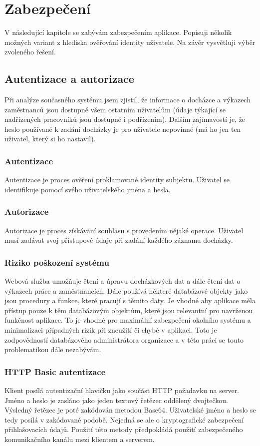 \documentclass{diplomka}
\begin{document}
\chapter{Zabezpečení}
V následující kapitole se zabývám zabezpečením aplikace. Popisuji několik možných variant z hlediska ověřování identity uživatele. Na závěr vysvětluji výběr zvoleného řešení.
\section{Autentizace a autorizace}
Při analýze současného systému jsem zjistil, že informace o docházce a výkazech zaměstnanců jsou dostupné všem ostatním uživatelům (údaje týkající se nadřízených pracovníků jsou dostupné i podřízením). Dalším zajímavostí je, že heslo používané k zadání docházky je pro uživatele nepovinné (má ho jen ten uživatel, který si ho nastavil). 

\subsection*{Autentizace}
Autentizace je proces ověření proklamované identity subjektu. Uživatel se identifikuje pomocí svého uživatelského jména a hesla.

\subsection*{Autorizace}
Autorizace je proces získávání souhlasu s provedením nějaké operace. Uživatel musí zadávat svoj přístupové údaje při zadání každého záznamu docházky. 

\subsection*{Riziko poškození systému}
Webová služba umožňuje čtení a úpravu docházkových dat a dále čtení dat o výkazech práce a zaměstnancích. Dále používá některé databázové objekty jako jsou procedury a funkce, které pracují s těmito daty. Je vhodné aby aplikace měla přístup pouze k těm databázovým objektům, které jsou relevantní pro navrženou funkčnost aplikace. To je vhodné pro maximální zabezpečení okolního systému a minimalizaci případných rizik při zneužití či chybě v aplikaci. Toto je zodpovědností databázového administrátora organizace a v této práci se touto problematikou dále nezabývám.

\subsection*{HTTP Basic autentizace}
Klient posílá autentizační hlavičku jako součást HTTP požadavku na server. Jméno a heslo je zasláno jako jeden textový řetězec oddělený dvojtečkou. Výsledný řetězec je poté zakódován metodou Base64. Uživatelské jméno a heslo se tedy posílá v zakódované podobě. Nejedná se ale o kryptografické zabezpečení přihlašovacích údajů. Použití této metody předpokládá použití zabezpečeného komunikačního kanálu mezi klientem a serverem.
\end{document}
